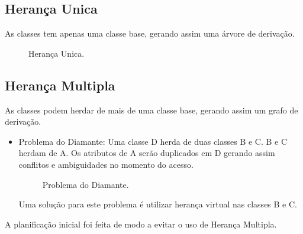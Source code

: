 \documentclass[rel_mlp]{iiufrgs}
\newcommand{\fonte}[1]{\\Fonte: {#1}}
\begin{document}
\subsection{Herança Unica}
As classes tem apenas uma classe base, gerando assim uma árvore de derivação.

\begin{figure}[htb]
    \centering
    \label{fig:figura2}
    \caption{Herança Unica.}
\end{figure}


\subsection{Herança Multipla}
As classes podem herdar de mais de uma classe base, gerando assim um grafo de derivação.
 \begin{itemize}
   \item Problema do Diamante: Uma classe D herda de duas classes B e C. B e C herdam de A. Os atributos de A serão duplicados em D gerando   assim conflitos e ambiguidades no momento do acesso.
\begin{figure}[htb]
    \centering
    \label{fig:figura3}
    \caption{Problema do Diamante.}
\end{figure}



   Uma solução para este problema  é utilizar herança virtual nas classes B e C.
 \end{itemize}
 A planificação inicial foi feita de modo a evitar o uso de Herança Multipla.
\end{document}
